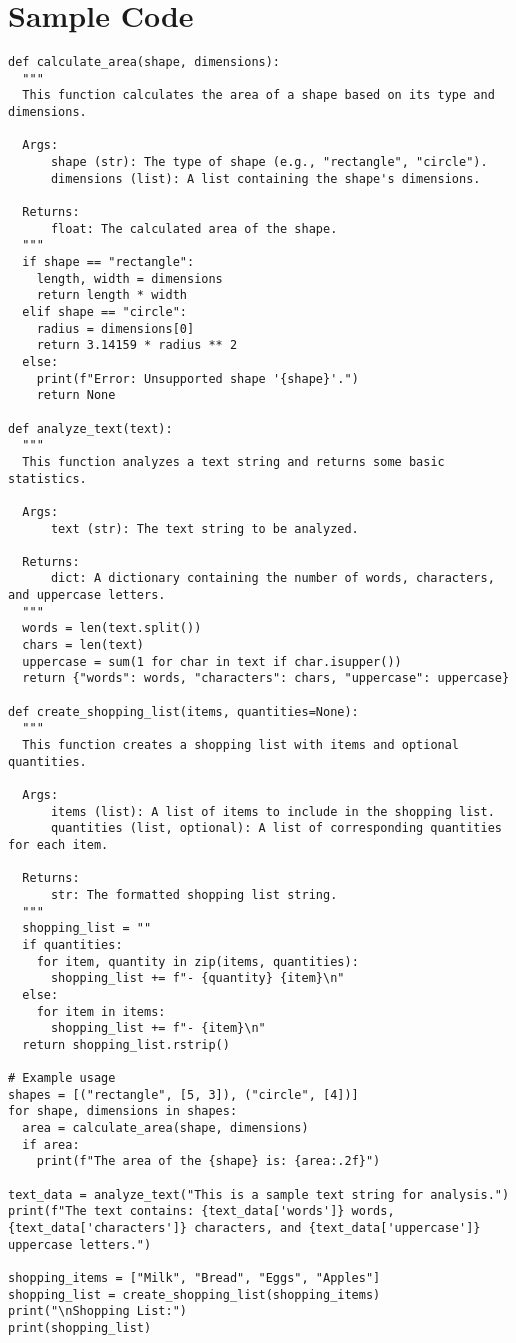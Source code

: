 \chapter{Sample Code}\label{app1}


\begin{lstlisting}
def calculate_area(shape, dimensions):
  """
  This function calculates the area of a shape based on its type and dimensions.

  Args:
      shape (str): The type of shape (e.g., "rectangle", "circle").
      dimensions (list): A list containing the shape's dimensions.

  Returns:
      float: The calculated area of the shape.
  """
  if shape == "rectangle":
    length, width = dimensions
    return length * width
  elif shape == "circle":
    radius = dimensions[0]
    return 3.14159 * radius ** 2
  else:
    print(f"Error: Unsupported shape '{shape}'.")
    return None

def analyze_text(text):
  """
  This function analyzes a text string and returns some basic statistics.

  Args:
      text (str): The text string to be analyzed.

  Returns:
      dict: A dictionary containing the number of words, characters, and uppercase letters.
  """
  words = len(text.split())
  chars = len(text)
  uppercase = sum(1 for char in text if char.isupper())
  return {"words": words, "characters": chars, "uppercase": uppercase}

def create_shopping_list(items, quantities=None):
  """
  This function creates a shopping list with items and optional quantities.

  Args:
      items (list): A list of items to include in the shopping list.
      quantities (list, optional): A list of corresponding quantities for each item. 

  Returns:
      str: The formatted shopping list string.
  """
  shopping_list = ""
  if quantities:
    for item, quantity in zip(items, quantities):
      shopping_list += f"- {quantity} {item}\n"
  else:
    for item in items:
      shopping_list += f"- {item}\n"
  return shopping_list.rstrip()

# Example usage
shapes = [("rectangle", [5, 3]), ("circle", [4])]
for shape, dimensions in shapes:
  area = calculate_area(shape, dimensions)
  if area:
    print(f"The area of the {shape} is: {area:.2f}")

text_data = analyze_text("This is a sample text string for analysis.")
print(f"The text contains: {text_data['words']} words, {text_data['characters']} characters, and {text_data['uppercase']} uppercase letters.")

shopping_items = ["Milk", "Bread", "Eggs", "Apples"]
shopping_list = create_shopping_list(shopping_items)
print("\nShopping List:")
print(shopping_list)
\end{lstlisting}